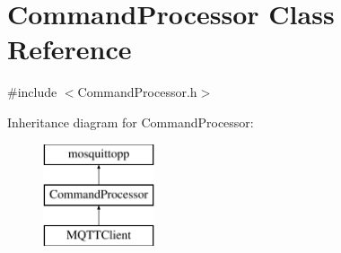 \hypertarget{class_command_processor}{}\section{Command\+Processor Class Reference}
\label{class_command_processor}


{\ttfamily \#include $<$Command\+Processor.\+h$>$}

Inheritance diagram for Command\+Processor\+:\begin{figure}[H]
\begin{center}
\leavevmode
\includegraphics[height=3.000000cm]{class_command_processor}
\end{center}
\end{figure}
